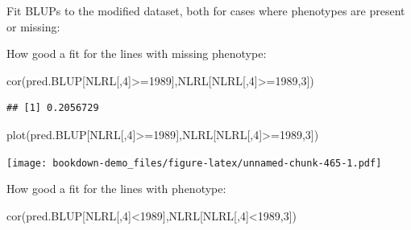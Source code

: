 \documentclass[
]{book}
\newenvironment{Shaded}{\begin{snugshade}}{\end{snugshade}}
\newcommand{\AttributeTok}[1]{\textcolor[rgb]{0.77,0.63,0.00}{#1}}
\newcommand{\DecValTok}[1]{\textcolor[rgb]{0.00,0.00,0.81}{#1}}
\newcommand{\FunctionTok}[1]{\textcolor[rgb]{0.00,0.00,0.00}{#1}}
\newcommand{\NormalTok}[1]{#1}
\newcommand{\OtherTok}[1]{\textcolor[rgb]{0.56,0.35,0.01}{#1}}
\newcommand{\SpecialCharTok}[1]{\textcolor[rgb]{0.00,0.00,0.00}{#1}}
\begin{document}
Fit BLUPs to the modified dataset, both for cases where phenotypes are present or missing:

\begin{Shaded}
\end{Shaded}

How good a fit for the lines with missing phenotype:

\begin{Shaded}
\begin{Highlighting}[]
\FunctionTok{cor}\NormalTok{(pred.BLUP[NLRL[,}\DecValTok{4}\NormalTok{]}\SpecialCharTok{\textgreater{}=}\DecValTok{1989}\NormalTok{],NLRL[NLRL[,}\DecValTok{4}\NormalTok{]}\SpecialCharTok{\textgreater{}=}\DecValTok{1989}\NormalTok{,}\DecValTok{3}\NormalTok{])}
\end{Highlighting}
\end{Shaded}

\begin{verbatim}
## [1] 0.2056729
\end{verbatim}

\begin{Shaded}
\begin{Highlighting}[]
\FunctionTok{plot}\NormalTok{(pred.BLUP[NLRL[,}\DecValTok{4}\NormalTok{]}\SpecialCharTok{\textgreater{}=}\DecValTok{1989}\NormalTok{],NLRL[NLRL[,}\DecValTok{4}\NormalTok{]}\SpecialCharTok{\textgreater{}=}\DecValTok{1989}\NormalTok{,}\DecValTok{3}\NormalTok{])}
\end{Highlighting}
\end{Shaded}

\texttt{[image: bookdown-demo\_files/figure-latex/unnamed-chunk-465-1.pdf]}

How good a fit for the lines with phenotype:

\begin{Shaded}
\begin{Highlighting}[]
\FunctionTok{cor}\NormalTok{(pred.BLUP[NLRL[,}\DecValTok{4}\NormalTok{]}\SpecialCharTok{\textless{}}\DecValTok{1989}\NormalTok{],NLRL[NLRL[,}\DecValTok{4}\NormalTok{]}\SpecialCharTok{\textless{}}\DecValTok{1989}\NormalTok{,}\DecValTok{3}\NormalTok{])}
\end{Highlighting}
\end{Shaded}
\end{document}
